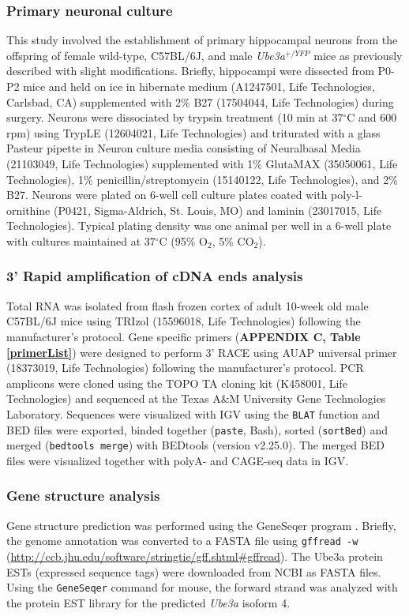 \subsubsection{Primary neuronal culture}
This study involved the establishment of primary hippocampal neurons from the offspring of female wild-type, C57BL/6J, and male \textit{Ube3a$^{+/YFP}$} mice as previously described \cite{Kavalali1999} with slight modifications. Briefly, hippocampi were dissected from P0-P2 mice and held on ice in hibernate medium (A1247501, Life Technologies, Carlsbad, CA) supplemented with 2\% B27 (17504044, Life Technologies) during surgery. Neurons were dissociated by trypsin treatment (10 min at 37$^{\circ}$C and 600 rpm) using TrypLE (12604021, Life Technologies) and triturated with a glass Pasteur pipette in Neuron culture media consisting of Neuralbasal Media (21103049, Life Technologies) supplemented with 1\% GlutaMAX (35050061, Life Technologies), 1\% penicillin/streptomycin (15140122, Life Technologies), and 2\% B27. Neurons were plated on 6-well cell culture plates coated with poly-l-ornithine (P0421, Sigma-Aldrich, St. Louis, MO) and laminin (23017015, Life Technologies). Typical plating density was one animal per well in a 6-well plate with cultures maintained at 37$^{\circ}$C (95\% O$_2$, 5\% CO$_2$).

\subsubsection{3' Rapid amplification of cDNA ends analysis}
Total RNA was isolated from flash frozen cortex of adult 10-week old male C57BL/6J mice using TRIzol (15596018, Life Technologies) following the manufacturer's protocol. Gene specific primers (\textbf{APPENDIX C, Table \ref{primerList}}) were designed to perform 3' RACE using AUAP universal primer (18373019, Life Technologies) following the manufacturer's protocol. PCR amplicons were cloned using the TOPO TA cloning kit (K458001, Life Technologies) and sequenced at the Texas A\&M University Gene Technologies Laboratory. Sequences were visualized with IGV using the \texttt{BLAT} function and BED files were exported, binded together (\texttt{paste}, Bash), sorted (\texttt{sortBed}) and merged (\texttt{bedtools merge}) with BEDtools \cite{Quinlan2010} (version v2.25.0). The merged BED files were visualized together with polyA- and CAGE-seq data in IGV.

\subsubsection*{Gene structure analysis}
Gene structure prediction was performed using the GeneSeqer program \cite{Brendel2004}. Briefly, the genome annotation was converted to a FASTA file using \texttt{gffread -w} (\url{http://ccb.jhu.edu/software/stringtie/gff.shtml#gffread}). The Ube3a protein ESTs (expressed sequence tags) were downloaded from NCBI as FASTA files. Using the \texttt{GeneSeqer} command for mouse, the forward strand was analyzed with the protein EST library for the predicted \textit{Ube3a} isoform 4.


